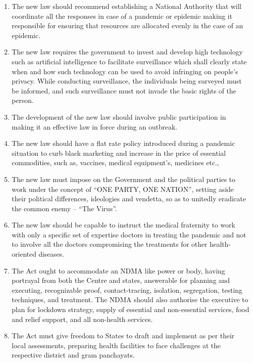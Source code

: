 \begin{multicols}{2}
\begin{enumerate}[label=$\bullet$]
\item The new law should recommend establishing a National Authority that will
coordinate all the responses in case of a pandemic or epidemic making it responsible
for ensuring that resources are allocated evenly in the case of an epidemic.

\item The new law requires the government to invest and develop high technology such as
artificial intelligence to facilitate surveillance which shall clearly state when and how
such technology can be used to avoid infringing on people’s privacy. While
conducting surveillance, the individuals being surveyed must be informed, and such
surveillance must not invade the basic rights of the person.

\item The development of the new law should involve public participation in making it an
effective law in force during an outbreak.

\item The new law should have a flat rate policy introduced during a pandemic situation to
curb black marketing and increase in the price of essential commodities, such as,
vaccines, medical equipment’s, medicines etc.,

\item The new law must impose on the Government and the political parties to work under
the concept of “ONE PARTY, ONE NATION”, setting aside their political
differences, ideologies and vendetta, so as to unitedly eradicate the common enemy –
“The Virus”.

\item The new law should be capable to instruct the medical fraternity to work with only a
specific set of expertise doctors in treating the pandemic and not to involve all the
doctors compromising the treatments for other health-oriented diseases.

\item The Act ought to accommodate an NDMA like power or body, having portrayal from
both the Centre and states, answerable for planning and executing, recognizable proof,
contact-tracing, isolation, segregation, testing techniques, and treatment. The NDMA
should also authorise the executive to plan for lockdown strategy, supply of essential
and non-essential services, food and relief support, and all non-health services.

\item The Act must give freedom to States to draft and implement as per their local
assessments, preparing health facilities to face challenges at the respective district and
gram panchayats.


\end{enumerate}
\end{multicols}
